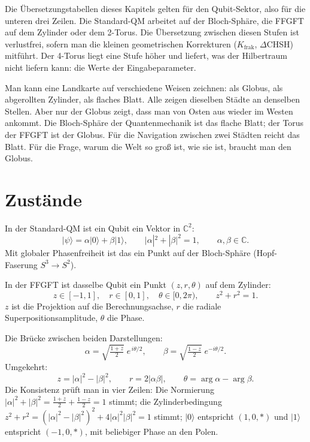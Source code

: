 Die Übersetzungstabellen dieses Kapitels gelten für den Qubit-Sektor,
also für die unteren drei Zeilen. Die Standard-QM arbeitet auf der
Bloch-Sphäre, die FFGFT auf dem Zylinder oder dem 2-Torus. Die
Übersetzung zwischen diesen Stufen ist verlustfrei, sofern man die
kleinen geometrischen Korrekturen ($K_{\mathrm{frak}}$, $\Delta$CHSH)
mitführt. Der 4-Torus liegt eine Stufe höher und liefert, was der
Hilbertraum nicht liefern kann: die Werte der Eingabeparameter.

\begin{laierspur}
Man kann eine Landkarte auf verschiedene Weisen zeichnen: als Globus,
als abgerollten Zylinder, als flaches Blatt. Alle zeigen dieselben
Städte an denselben Stellen. Aber nur der Globus zeigt, dass man von
Osten aus wieder im Westen ankommt. Die Bloch-Sphäre der
Quantenmechanik ist das flache Blatt; der Torus der FFGFT ist der Globus.
Für die Navigation zwischen zwei Städten reicht das Blatt. Für die
Frage, warum die Welt so groß ist, wie sie ist, braucht man den Globus.
\end{laierspur}

\section{Zustände}

In der Standard-QM ist ein Qubit ein Vektor in $\mathbb{C}^2$:
\begin{equation}
  |\psi\rangle = \alpha|0\rangle + \beta|1\rangle,\qquad
  |\alpha|^2+|\beta|^2 = 1,\qquad \alpha,\beta\in\mathbb{C}.
\end{equation}
Mit globaler Phasenfreiheit ist das ein Punkt auf der Bloch-Sphäre
(Hopf-Faserung $S^3\to S^2$).

In der FFGFT ist dasselbe Qubit ein Punkt $(z,r,\theta)$ auf dem
Zylinder:
\begin{equation}
  z\in[-1,1],\quad r\in[0,1],\quad \theta\in[0,2\pi),\qquad z^2+r^2 = 1.
\end{equation}
$z$ ist die Projektion auf die Berechnungsachse, $r$ die radiale
Superpositionsamplitude, $\theta$ die Phase.

Die Brücke zwischen beiden Darstellungen:
\begin{equation}
  \boxed{\;
  \alpha = \sqrt{\tfrac{1+z}{2}}\;e^{\,i\theta/2},\qquad
  \beta = \sqrt{\tfrac{1-z}{2}}\;e^{-i\theta/2}.\;}
  \label{eq:state-bridge}
\end{equation}
Umgekehrt:
\begin{equation}
  z = |\alpha|^2-|\beta|^2,\qquad
  r = 2|\alpha\beta|,\qquad
  \theta = \arg\alpha-\arg\beta.
\end{equation}
Die Konsistenz prüft man in vier Zeilen: Die Normierung
$|\alpha|^2+|\beta|^2 = \frac{1+z}{2}+\frac{1-z}{2} = 1$ stimmt; die
Zylinderbedingung $z^2+r^2 = (|\alpha|^2-|\beta|^2)^2+4|\alpha|^2|\beta|^2 = 1$
stimmt; $|0\rangle$ entspricht $(1,0,\ast)$ und $|1\rangle$ entspricht
$(-1,0,\ast)$, mit beliebiger Phase an den Polen.

